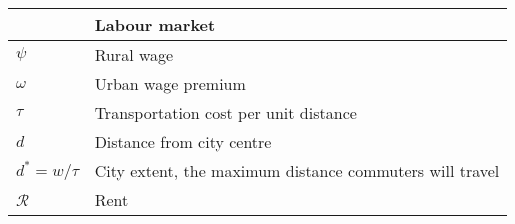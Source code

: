 \begin{longtable}{lp{10cm}}
\hline           &  \textbf{Labour market}      \\ \hline %
$\psi$           &  Rural wage                  \\ %
$\omega$         &  Urban wage premium          \\
$\tau$           &  Transportation cost per unit distance \\
$d$              &  Distance from city centre   \\
$d^* = w/\tau$   &  City extent, the maximum distance commuters will travel \\ %
$\mathcal{R}$    &  Rent                        \\ 


\end{longtable}
